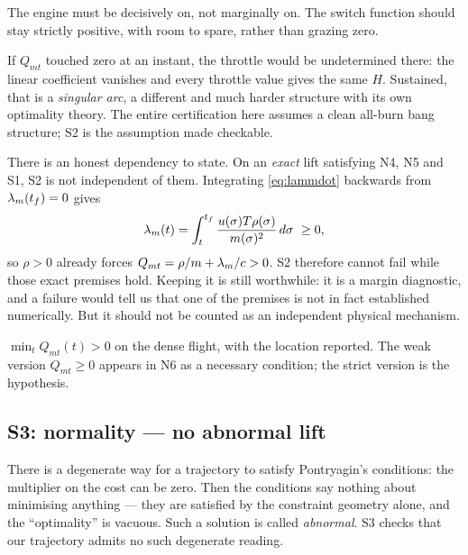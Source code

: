 \documentclass[11pt]{article}
\newcommand{\tf}{t_f}\newcommand{\R}{\mathbb{R}}
\newcommand{\Qmt}{Q_{mt}}
\begin{document}
\begin{eli}
The engine must be decisively on, not marginally on. The switch function should
stay strictly positive, with room to spare, rather than grazing zero.
\end{eli}

\begin{intu}
If $\Qmt$ touched zero at an instant, the throttle would be undetermined there:
the linear coefficient vanishes and every throttle value gives the same $H$.
Sustained, that is a \emph{singular arc}, a different and much harder structure
with its own optimality theory. The entire certification here assumes a clean
all-burn bang structure; S2 is the assumption made checkable.

There is an honest dependency to state. On an \emph{exact} lift satisfying
N4, N5 and S1, S2 is not independent of them. Integrating \eqref{eq:lammdot}
backwards from $\lm(\tf) = 0$ gives
\[
\lm(t) = \int_t^{\tf} \frac{u(\sigma) T \rho(\sigma)}{m(\sigma)^2} \, d\sigma \ \ge 0,
\]
so $\rho > 0$ already forces $\Qmt = \rho/m + \lm/c > 0$. S2 therefore cannot
fail while those exact premises hold. Keeping it is still worthwhile: it is a
margin diagnostic, and a failure would tell us that one of the premises is not
in fact established numerically. But it should not be counted as an independent
physical mechanism.
\end{intu}

\begin{rig}
$\min_t \Qmt(t) > 0$ on the dense flight, with the location reported. The weak
version $\Qmt \ge 0$ appears in N6 as a necessary condition; the strict version
is the hypothesis.
\end{rig}

\subsection{S3: normality --- no abnormal lift}\label{sec:S3}

\begin{eli}
There is a degenerate way for a trajectory to satisfy Pontryagin's conditions:
the multiplier on the cost can be zero. Then the conditions say nothing about
minimising anything --- they are satisfied by the constraint geometry alone, and
the ``optimality'' is vacuous. Such a solution is called \emph{abnormal}. S3
checks that our trajectory admits no such degenerate reading.
\end{eli}
\end{document}
